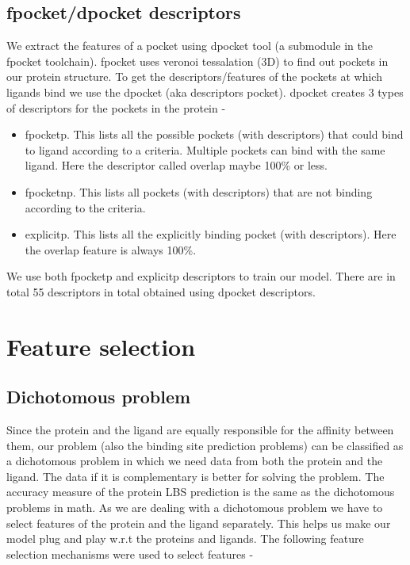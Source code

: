 \documentclass[11pt]{article}
\begin{document}
\subsection{fpocket/dpocket descriptors}
We extract the features of a pocket using dpocket tool (a submodule in the fpocket toolchain).
fpocket uses veronoi tessalation (3D) to find out pockets in our protein structure.
To get the descriptors/features of the pockets at which ligands bind we use the dpocket (aka descriptors pocket).
dpocket creates 3 types of descriptors for the pockets in the protein -
\begin{itemize}
\item fpocketp.  This lists all the possible pockets (with descriptors) that could bind to ligand according to a criteria.
Multiple pockets can bind with the same ligand.
Here the descriptor called overlap maybe 100\% or less.
\item fpocketnp.  This lists all pockets (with descriptors) that are not binding according to the criteria.
\item explicitp.
This lists all the explicitly binding pocket (with descriptors).
Here the overlap feature is always 100\%.
\end{itemize}

We use both fpocketp and explicitp descriptors to train our model.
There are in total 55 descriptors in total obtained using dpocket descriptors.



\section{Feature selection}

\subsection{Dichotomous problem}
Since the protein and the ligand are equally responsible for the affinity between them, our problem (also the binding site prediction problems) can be classified as a dichotomous problem in which we need data from both
the protein and the ligand.
The data if it is complementary is better for solving the problem.
The accuracy measure of the protein LBS prediction is the same as the dichotomous problems in math.
As we are dealing with a dichotomous problem we have to select features of the protein and the ligand separately.
This helps us make our model plug and play w.r.t the proteins and ligands.
The following feature selection mechanisms were used to select features -
\end{document}
